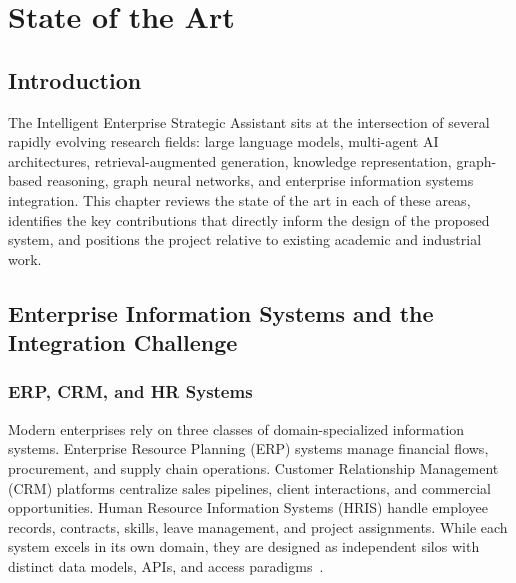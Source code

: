 
\chapter{State of the Art}
\thispagestyle{fancy}

\section{Introduction}

The Intelligent Enterprise Strategic Assistant sits at the intersection of
several rapidly evolving research fields: large language models, multi-agent
AI architectures, retrieval-augmented generation, knowledge representation,
graph-based reasoning, graph neural networks, and enterprise information
systems integration. This chapter reviews the state of the art in each of
these areas, identifies the key contributions that directly inform the design
of the proposed system, and positions the project relative to existing
academic and industrial work.

\section{Enterprise Information Systems and the Integration Challenge}

\subsection{ERP, CRM, and HR Systems}

Modern enterprises rely on three classes of domain-specialized information
systems. Enterprise Resource Planning (ERP) systems manage financial flows,
procurement, and supply chain operations. Customer Relationship Management
(CRM) platforms centralize sales pipelines, client interactions, and
commercial opportunities. Human Resource Information Systems (HRIS) handle
employee records, contracts, skills, leave management, and project
assignments. While each system excels in its own domain, they are designed
as independent silos with distinct data models, APIs, and access
paradigms~\cite{laudon2020mis}.

